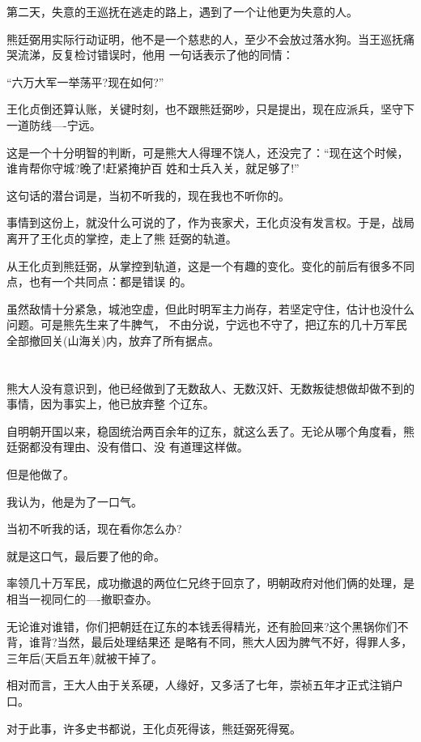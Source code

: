 \documentclass[11pt,a4paper,onecolumn]{article}
\begin{document}
第二天，失意的王巡抚在逃走的路上，遇到了一个让他更为失意的人。

熊廷弼用实际行动证明，他不是一个慈悲的人，至少不会放过落水狗。当王巡抚痛哭流涕，反复检讨错误时，他用
一句话表示了他的同情：

``六万大军一举荡平?现在如何?''

王化贞倒还算认账，关键时刻，也不跟熊廷弼吵，只是提出，现在应派兵，坚守下一道防线----宁远。

这是一个十分明智的判断，可是熊大人得理不饶人，还没完了：``现在这个时候，谁肯帮你守城?晚了!赶紧掩护百
姓和士兵入关，就足够了!''

这句话的潜台词是，当初不听我的，现在我也不听你的。

事情到这份上，就没什么可说的了，作为丧家犬，王化贞没有发言权。于是，战局离开了王化贞的掌控，走上了熊
廷弼的轨道。

从王化贞到熊廷弼，从掌控到轨道，这是一个有趣的变化。变化的前后有很多不同点，也有一个共同点：都是错误
的。

虽然敌情十分紧急，城池空虚，但此时明军主力尚存，若坚定守住，估计也没什么问题。可是熊先生来了牛脾气，
不由分说，宁远也不守了，把辽东的几十万军民全部撤回关(山海关)内，放弃了所有据点。

\section[\thesection]{}

熊大人没有意识到，他已经做到了无数敌人、无数汉奸、无数叛徒想做却做不到的事情，因为事实上，他已放弃整
个辽东。

自明朝开国以来，稳固统治两百余年的辽东，就这么丢了。无论从哪个角度看，熊廷弼都没有理由、没有借口、没
有道理这样做。

但是他做了。

我认为，他是为了一口气。

当初不听我的话，现在看你怎么办?

就是这口气，最后要了他的命。

率领几十万军民，成功撤退的两位仁兄终于回京了，明朝政府对他们俩的处理，是相当一视同仁的----撤职查办。

无论谁对谁错，你们把朝廷在辽东的本钱丢得精光，还有脸回来?这个黑锅你们不背，谁背?当然，最后处理结果还
是略有不同，熊大人因为脾气不好，得罪人多，三年后(天启五年)就被干掉了。

相对而言，王大人由于关系硬，人缘好，又多活了七年，崇祯五年才正式注销户口。

对于此事，许多史书都说，王化贞死得该，熊廷弼死得冤。
\end{document}
